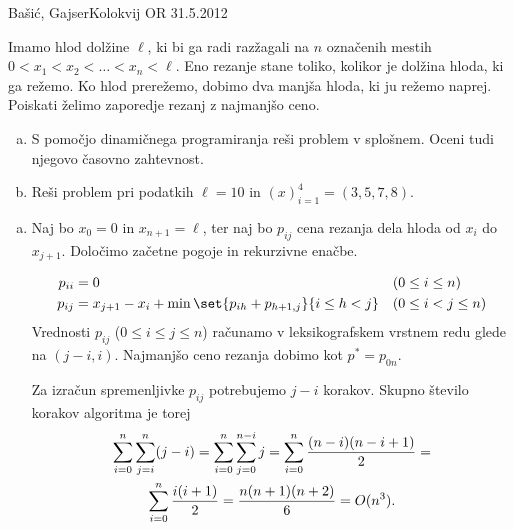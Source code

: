 \begin{naloga}{Bašić, Gajser}{Kolokvij OR 31.5.2012}
\begin{vprasanje}
Imamo hlod dolžine $\ell$,
ki bi ga radi razžagali na $n$ označenih mestih
$0 < x_1 < x_2 < \dots < x_n < \ell$.
Eno rezanje stane toliko, kolikor je dolžina hloda, ki ga režemo.
Ko hlod prerežemo, dobimo dva manjša hloda, ki ju režemo naprej.
Poiskati želimo zaporedje rezanj z najmanjšo ceno.
\begin{enumerate}[(a)]
\item S pomočjo dinamičnega programiranja reši problem v splošnem.
Oceni tudi njegovo časovno zahtevnost.
\item Reši problem pri podatkih $\ell = 10$ in $(x)_{i=1}^4 = (3, 5, 7, 8)$.
\end{enumerate}
\end{vprasanje}

\begin{odgovor}
\begin{enumerate}[(a)]
\item Naj bo $x_0 = 0$ in $x_{n+1} = \ell$,
ter naj bo $p_{ij}$ cena rezanja dela hloda od $x_i$ do $x_{j+1}$.
Določimo začetne pogoje in rekurzivne enačbe.

\begin{align*}
p_{ii} &= 0 && (0 \le i \le n) \\
p_{ij} &= x_{j+1} - x_i + \min\set{p_{ih} + p_{h+1,j}}{i \le h < j}
&& (0 \le i < j \le n)
\end{align*}
Vrednosti $p_{ij}$ ($0 \le i \le j \le n$)
računamo v leksikografskem vrstnem redu glede na $(j-i, i)$.
Najmanjšo ceno rezanja dobimo kot $p^* = p_{0n}$.

Za izračun spremenljivke $p_{ij}$ potrebujemo $j-i$ korakov.
Skupno število korakov algoritma je torej
\begin{multline*}
\sum_{i=0}^n \sum_{j=i}^n (j-i) = \sum_{i=0}^n \sum_{j=0}^{n-i} j =
\sum_{i=0}^n {(n-i)(n-i+1) \over 2} = \\
\sum_{i=0}^n {i(i+1) \over 2} = {n(n+1)(n+2) \over 6} = O(n^3) .
\end{multline*}


\end{enumerate}
\end{odgovor}
\end{naloga}
